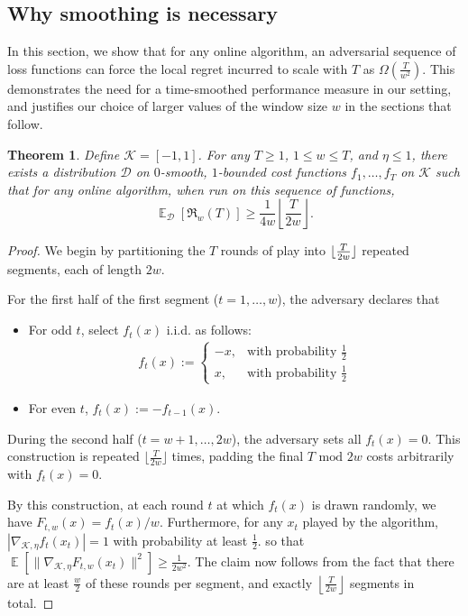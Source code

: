 \documentclass{article}
\DeclarePairedDelimiter\floor{\lfloor}{\rfloor}
\def\norm#1{\mathopen\| #1 \mathclose\|}
\newcommand{\K}{\ensuremath{\mathcal K}}
\newcommand{\bra}[1]{\left[#1\right]}
\DeclareMathOperator*{\E}{\mathbb{E}}
\newtheorem{theorem}{Theorem}[section]
\renewcommand{\K}{\mathcal{K}}
\newcommand{\regret}{\mathfrak{R}}
\begin{document}
\subsection{Why smoothing is necessary}
In this section, we show that for any online algorithm, an adversarial sequence of loss functions can force the local regret incurred to scale with $T$ as $\Omega\left(\frac{T}{w^2}\right)$. This demonstrates the need for a time-smoothed performance measure in our setting, and justifies our choice of larger values of the window size $w$ in the sections that follow.
\begin{theorem}
Define $\K=[-1,1]$. For any $T \geq 1$, $1 \leq w \leq T$, and $\eta \leq 1$, there exists a distribution $\mathcal{D}$ on $0$-smooth, $1$-bounded cost functions $f_1,\dots, f_T$ on $\K$ such that for any online algorithm, when run on this sequence of functions,
\[\E_\mathcal{D} \bra{ \regret_w(T) } \geq \frac{1}{4w} \left\lfloor \frac{T}{2w} \right\rfloor. \]
\end{theorem}
\begin{proof}
We begin by partitioning the $T$ rounds of play into $\floor{\frac{T}{2w}}$ repeated segments, each of length $2w$.

For the first half of the first segment ($t = 1, \ldots, w$), the adversary declares that
\begin{itemize}
\item For odd $t$, select $f_t(x)$ i.i.d. as follows:
\begin{align*}
f_t(x) := \begin{cases}
-x, & \textrm{with probability }\frac{1}{2}\\
x, & \textrm{with probability }\frac{1}{2}
\end{cases}
\end{align*}
\item For even $t$, $f_t(x) := -f_{t-1}(x)$.
\end{itemize}

During the second half ($t = w+1, \ldots, 2w$), the adversary sets all $f_t(x) = 0$. This construction is repeated $\lfloor \frac{T}{2w} \rfloor$ times, padding the final $T\textrm{ mod }2w$ costs arbitrarily with $f_t(x) = 0$.

By this construction, at each round $t$ at which $f_t(x)$ is drawn randomly, we have
$F_{t,w}(x) = f_t(x) / w$. Furthermore, for any $x_t$ played by the algorithm, $|\nabla_{\K,\eta} f_t(x_t)| = 1$ with probability at least $\frac{1}{2}$. so that $\E\bra{ \norm{ \nabla_{\K, \eta} F_{t,w}(x_t) }^2 } \geq \frac{1}{2w^2}$. The claim now follows from the fact that there are at least $\frac{w}{2}$ of these rounds per segment, and exactly $\left\lfloor \frac{T}{2w} \right\rfloor$ segments in total.
\end{proof}
\end{document}
